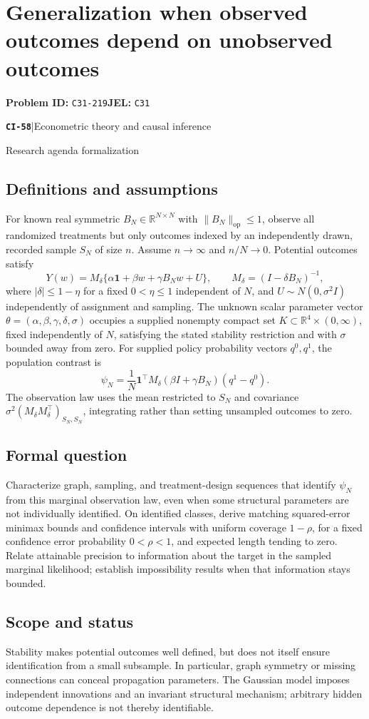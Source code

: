 \documentclass[11pt,a4paper]{article}
\newcommand{\R}{\mathbb R}
\newcommand{\entrymeta}[3]{{\sffamily\small\color{muted}\textbf{\texttt{#1}}\quad|\quad #2\par #3\par}}
\begin{document}
\section*{Generalization when observed outcomes depend on unobserved outcomes}
\textbf{Problem ID:} \texttt{C31-219}\quad \textbf{JEL:} \texttt{C31}\par
\label{problem:OP-0537}
\label{beyond:CI-58}
\entrymeta{CI-58}{Econometric theory and causal inference}{Research agenda formalization}
\subsection*{Definitions and assumptions}
For known real symmetric $B_N\in\R^{N\times N}$ with $\|B_N\|_{\mathrm{op}}\leq1$, observe all randomized treatments but only outcomes indexed by an independently drawn, recorded sample $S_N$ of size $n$. Assume $n\to\infty$ and $n/N\to0$. Potential outcomes satisfy
\[
 Y(w)=M_\delta\{\alpha\mathbf1+\beta w+\gamma B_Nw+U\},
 \qquad M_\delta=(I-\delta B_N)^{-1},
\]
where $|\delta|\leq1-\eta$ for a fixed $0<\eta\leq1$ independent of $N$, and $U\sim N(0,\sigma^2 I)$ independently of assignment and sampling. The unknown scalar parameter vector $\theta=(\alpha,\beta,\gamma,\delta,\sigma)$ occupies a supplied nonempty compact set $K\subset\R^4\times(0,\infty)$, fixed independently of $N$, satisfying the stated stability restriction and with $\sigma$ bounded away from zero. For supplied policy probability vectors $q^0,q^1$, the population contrast is
\[
 \psi_N=\frac1N\mathbf1^\top
 M_\delta(\beta I+\gamma B_N)(q^1-q^0).
\]
The observation law uses the mean restricted to $S_N$ and covariance $\sigma^2(M_\delta M_\delta^\top)_{S_N,S_N}$, integrating rather than setting unsampled outcomes to zero.
\subsection*{Formal question}
Characterize graph, sampling, and treatment-design sequences that identify $\psi_N$ from this marginal observation law, even when some structural parameters are not individually identified. On identified classes, derive matching squared-error minimax bounds and confidence intervals with uniform coverage $1-\rho$, for a fixed confidence error probability $0<\rho<1$, and expected length tending to zero. Relate attainable precision to information about the target in the sampled marginal likelihood; establish impossibility results when that information stays bounded.
\subsection*{Scope and status}
Stability makes potential outcomes well defined, but does not itself ensure identification from a small subsample. In particular, graph symmetry or missing connections can conceal propagation parameters. The Gaussian model imposes independent innovations and an invariant structural mechanism; arbitrary hidden outcome dependence is not thereby identifiable.
\end{document}
